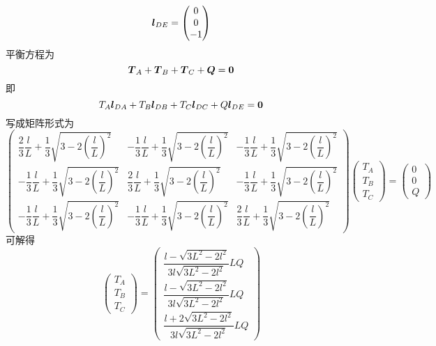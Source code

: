 \begin{solution}
\begin{align*}
	\boldsymbol{l}_{DE} = \begin{pmatrix} 0 \\ 0 \\ -1 \end{pmatrix}
\end{align*}
平衡方程为
\begin{equation*}
	\boldsymbol{T}_A + \boldsymbol{T}_B + \boldsymbol{T}_C + \boldsymbol{Q} = \boldsymbol{0}
\end{equation*}
即
\begin{equation*}
	T_A\boldsymbol{l}_{DA} + T_B\boldsymbol{l}_{DB} + T_C\boldsymbol{l}_{DC} + Q\boldsymbol{l}_{DE} = \boldsymbol{0}
\end{equation*}
写成矩阵形式为
\begin{equation*}
	\begin{pmatrix} 
		\dfrac23 \dfrac{l}{L} + \dfrac13 \sqrt{3-2\left(\dfrac{l}{L}\right)^2} & -\dfrac13 \dfrac{l}{L} + \dfrac13 \sqrt{3-2\left(\dfrac{l}{L}\right)^2} & -\dfrac13 \dfrac{l}{L} + \dfrac13 \sqrt{3-2\left(\dfrac{l}{L}\right)^2} \\[1.5ex]
		-\dfrac13 \dfrac{l}{L} + \dfrac13 \sqrt{3-2\left(\dfrac{l}{L}\right)^2} & \dfrac23 \dfrac{l}{L} + \dfrac13 \sqrt{3-2\left(\dfrac{l}{L}\right)^2} & -\dfrac13 \dfrac{l}{L} + \dfrac13 \sqrt{3-2\left(\dfrac{l}{L}\right)^2} \\[1.5ex]
		-\dfrac13 \dfrac{l}{L} + \dfrac13 \sqrt{3-2\left(\dfrac{l}{L}\right)^2} & -\dfrac13 \dfrac{l}{L} + \dfrac13 \sqrt{3-2\left(\dfrac{l}{L}\right)^2} & \dfrac23 \dfrac{l}{L} + \dfrac13 \sqrt{3-2\left(\dfrac{l}{L}\right)^2}
	\end{pmatrix} \begin{pmatrix} T_A \\ T_B \\ T_C \end{pmatrix} = \begin{pmatrix} 0 \\ 0 \\ Q \end{pmatrix}
\end{equation*}
可解得
\begin{equation*}
	\begin{pmatrix} T_A \\ T_B \\ T_C \end{pmatrix} = \begin{pmatrix} \dfrac{l-\sqrt{3L^2-2l^2}}{3l\sqrt{3L^2-2l^2}}LQ \\[1.5ex] \dfrac{l-\sqrt{3L^2-2l^2}}{3l\sqrt{3L^2-2l^2}}LQ \\[1.5ex] \dfrac{l+2\sqrt{3L^2-2l^2}}{3l\sqrt{3L^2-2l^2}}LQ \end{pmatrix}
\end{equation*}
\end{solution}

